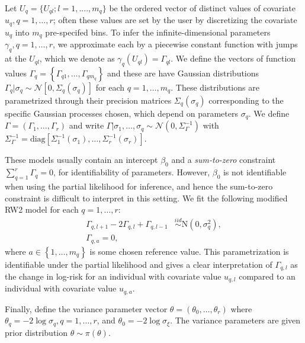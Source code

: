 \documentclass[serif,10pt]{wiley-article}
\begin{document}
Let $U_{q} = \{U_{ql};l = 1, ...., m_q\}$ be the ordered vector of distinct values of covariate $u_q,q = 1,\ldots,r$; often these values are set by the user by discretizing the covariate $u_q$ into $m_q$ pre-specifed bins. To infer the infinite-dimensional parameters $\gamma_{q},q = 1,\ldots,r$, we approximate each by a piecewise constant function with jumps at the $U_{ql}$, which we denote as $\gamma_{q}(U_{ql}) = \Gamma_{ql}$. We define the vectors of function values $\Gamma_{q} = \left\{ \Gamma_{q1},\ldots,\Gamma_{qm_{q}}\right\}$ and these are have Gaussian distributions $\Gamma_{q}|\sigma_{q}\sim\mathcal{N}\left[ 0,\Sigma_{q}(\sigma_{q})\right]$ for each $q = 1,\ldots,m_{q}$. These distributions are parametrized through their precision matrices $\Sigma_{q}(\sigma_{q})$ corresponding to the specific Gaussian processes chosen, which depend on parameters $\sigma_{q}$. We define $\Gamma = (\Gamma_{1},\ldots,\Gamma_{r})$ and write $\Gamma|\sigma_{1},\ldots,\sigma_{q}\sim\mathcal{N}\left( 0,\Sigma^{-1}_{\Gamma}\right)$ with $\Sigma^{-1}_{\Gamma} = \text{diag}\left[ \Sigma_{1}^{-1}(\sigma_{1}),\ldots,\Sigma_{r}^{-1}(\sigma_{r})\right]$.

These models usually contain an intercept $\beta_{0}$ and a \emph{sum-to-zero} constraint $\sum_{q=1}^{r}\Gamma_{q} = 0$, for identifiability of parameters. However, $\beta_{0}$ is not identifiable when using the partial likelihood for inference, and hence the sum-to-zero constraint is difficult to interpret in this setting. We fit the following modified RW2 model for each $q = 1,\ldots,r$:
\begin{equation}\begin{aligned}\label{eqn:rw2}
\Gamma_{q,l+1} - 2\Gamma_{q,l} + \Gamma_{q,l-1} &\overset{iid}{\sim}\text{N}\left( 0,\sigma^{2}_{q}\right), \\
\Gamma_{q,a} = 0,
\end{aligned}\end{equation}
where $a\in\left\lbrace 1,\ldots,m_{q}\right\rbrace$ is some chosen reference value. This parametrization is identifiable under the partial likelihood and gives a clear interpretation of $\Gamma_{q,l}$ as the change in log-risk for an individual with covariate value $u_{q,l}$ compared to an individual with covariate value $u_{q,a}$. 

Finally, define the variance parameter vector $\theta = (\theta_{0},\ldots,\theta_{r})$ where $\theta_{q} = -2\log\sigma_{q},q = 1,\ldots,r$, and $\theta_{0} = -2\log\sigma_{\xi}$. The variance parameters are given prior distribution $\theta \sim \pi(\theta)$. 
\end{document}
